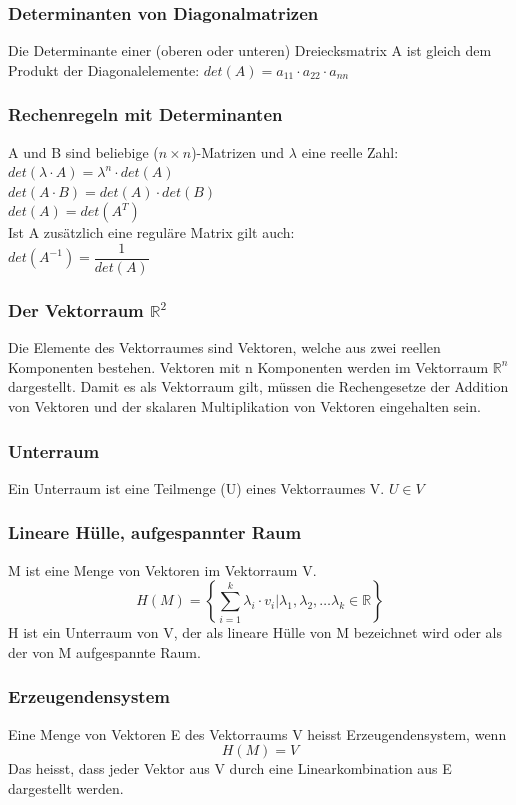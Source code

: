 \documentclass[10pt]{scrartcl}
\begin{document}
\begin{multicols}{2}
\subsubsection*{Determinanten von Diagonalmatrizen}
Die Determinante einer (oberen oder unteren) Dreiecksmatrix A ist gleich dem Produkt der Diagonalelemente: $det(A) = a_{11} \cdot a_{22} \cdot a_{nn}$
\subsubsection*{Rechenregeln mit Determinanten}
A und B sind beliebige ($n \times n$)-Matrizen und $\lambda$ eine reelle Zahl:\\
$det(\lambda \cdot A) = \lambda^n \cdot det(A)$\\
$det(A \cdot B) = det(A) \cdot det(B)$\\
$det(A) = det(A^T)$\\
Ist A zusätzlich eine reguläre Matrix gilt auch:\\
$det(A^{-1}) = \dfrac{1}{det(A)}$
\subsubsection*{Der Vektorraum $\mathbb{R}^2$}
Die Elemente des Vektorraumes sind Vektoren, welche aus zwei reellen Komponenten bestehen. Vektoren mit n Komponenten werden im Vektorraum $\mathbb{R}^n$ dargestellt. Damit es als Vektorraum gilt, müssen die Rechengesetze der Addition von Vektoren und der skalaren Multiplikation von Vektoren eingehalten sein.
\subsubsection*{Unterraum}
Ein Unterraum ist eine Teilmenge (U) eines Vektorraumes V. $U \in V$
\subsubsection*{Lineare Hülle, aufgespannter Raum}
M ist eine Menge von Vektoren im Vektorraum V.
\begin{equation}
H(M) = \left\lbrace\sum_{i=1}^k \lambda_i \cdot v_i | \lambda_1, \lambda_2, \dots \lambda_k \in\mathbb{R}\right\rbrace 
\end{equation}
H ist ein Unterraum von V, der als lineare Hülle von M bezeichnet wird oder als der von M aufgespannte Raum.
\subsubsection*{Erzeugendensystem}
Eine Menge von Vektoren E des Vektorraums V heisst Erzeugendensystem, wenn
\begin{equation}
H(M) = V
\end{equation}
Das heisst, dass jeder Vektor aus V durch eine Linearkombination aus E dargestellt werden.

\end{multicols}
\end{document}
